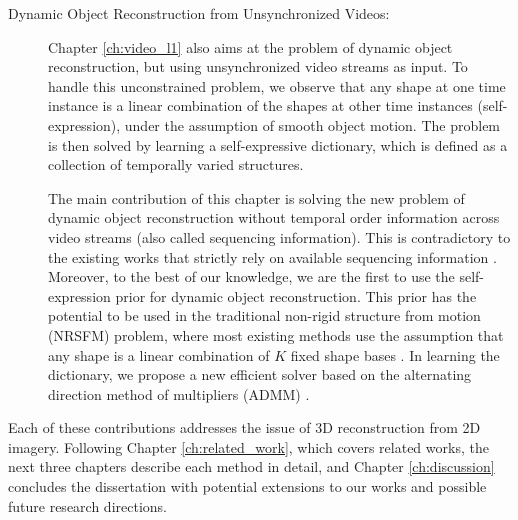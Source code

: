 \begin{description}
\item[Dynamic Object Reconstruction from Unsynchronized Videos:]
Chapter \ref{ch:video_l1} also aims at the problem of dynamic object reconstruction, but using unsynchronized video streams as input. To handle this unconstrained problem, we observe that any shape at one time instance is a linear combination of the shapes at other time instances (self-expression), under the assumption of smooth object motion. The problem is then solved by learning a self-expressive dictionary, which is defined as a collection of temporally varied structures. 

The main contribution of this chapter is solving the new problem of dynamic object reconstruction without temporal order information across video streams (also called sequencing information). This is contradictory to the existing works that strictly rely on available sequencing information \cite{Park_ECCV2010,Valmadre_CVPR2012}. 
Moreover, to the best of our knowledge, we are the first to use the self-expression prior for dynamic object reconstruction. This prior has the potential to be used in the traditional non-rigid structure from motion (NRSFM) problem, where most existing methods use the assumption that any shape is a linear combination of $K$ fixed shape bases \cite{dai2014simple,Bregler_CVPR2000}. In learning the dictionary, we propose a new efficient solver based on the alternating direction method of multipliers (ADMM) \cite{boyd2011distributed}.

\end{description}

Each of these contributions addresses the issue of 3D reconstruction from 2D imagery. Following Chapter \ref{ch:related_work}, which covers related works, the next three chapters describe each method in detail, and Chapter \ref{ch:discussion} concludes the dissertation with potential extensions to our works and possible future research directions. 

